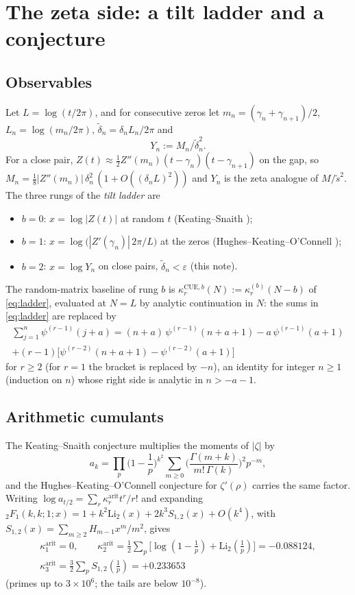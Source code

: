 \documentclass[12pt]{amsart}
\theoremstyle{remark}
\newcommand{\eps}{\varepsilon}
\newcommand{\1}{\mathbf{1}}
\begin{document}
\section{The zeta side: a tilt ladder and a conjecture}\label{sec:zeta}

\subsection*{Observables}
Let $L=\log(t/2\pi)$, and for consecutive zeros let
$m_n=(\gamma_n+\gamma_{n+1})/2$, $L_n=\log(m_n/2\pi)$,
$\tilde\delta_n=\delta_nL_n/2\pi$ and
\[
Y_n:=M_n/\tilde\delta_n^2 .
\]
For a close pair, $Z(t)\approx\frac12Z''(m_n)(t-\gamma_n)(t-\gamma_{n+1})$
on the gap, so $M_n=\frac18|Z''(m_n)|\,\delta_n^2\,(1+O((\delta_nL)^2))$ and
$Y_n$ is the zeta analogue of $M/\tilde s^2$. The three rungs of the
\emph{tilt ladder} are
\begin{itemize}
\item $b=0$: $x=\log|Z(t)|$ at random $t$ (Keating--Snaith \cite{KS00});
\item $b=1$: $x=\log\big(|Z'(\gamma_n)|\,2\pi/L\big)$ at the zeros
(Hughes--Keating--O'Connell \cite{HKO00});
\item $b=2$: $x=\log Y_n$ on close pairs, $\tilde\delta_n<\eps$ (this note).
\end{itemize}
The random-matrix baseline of rung $b$ is $\kappa_r^{\mathrm{CUE},b}(N):=
\kappa_r^{(b)}(N-b)$ of \eqref{eq:ladder}, evaluated at $N=L$ by analytic
continuation in $N$: the sums in \eqref{eq:ladder} are replaced by
\begin{multline*}
\sum_{j=1}^n\psi^{(r-1)}(j+a)=(n+a)\,\psi^{(r-1)}(n+a+1)-a\,\psi^{(r-1)}(a+1)\\
+(r-1)\big[\psi^{(r-2)}(n+a+1)-\psi^{(r-2)}(a+1)\big]
\end{multline*}
for $r\ge2$ (for $r=1$ the bracket is replaced by $-n$), an identity for
integer $n\ge1$ (induction on $n$) whose right side is analytic in
$n>-a-1$.

\subsection*{Arithmetic cumulants}
The Keating--Snaith conjecture \cite{KS00} multiplies the moments of
$|\zeta|$ by
\[
a_k=\prod_p\Big(1-\frac1p\Big)^{k^2}\sum_{m\ge0}
\Big(\frac{\Gamma(m+k)}{m!\,\Gamma(k)}\Big)^2p^{-m},
\]
and the Hughes--Keating--O'Connell conjecture for $\zeta'(\rho)$
\cite{HKO00} carries the same factor. Writing
$\log a_{t/2}=\sum_r\kappa_r^{\mathrm{arit}}t^r/r!$ and expanding
${}_2F_1(k,k;1;x)=1+k^2\mathrm{Li}_2(x)+2k^3S_{1,2}(x)+O(k^4)$, with
$S_{1,2}(x)=\sum_{m\ge2}H_{m-1}x^m/m^2$, gives
\begin{gather*}
\kappa_1^{\mathrm{arit}}=0,\qquad
\kappa_2^{\mathrm{arit}}=\tfrac12\sum_p\big[\log(1-\tfrac1p)+\mathrm{Li}_2(\tfrac1p)\big]
=-0.088124,\\
\kappa_3^{\mathrm{arit}}=\tfrac32\sum_pS_{1,2}(\tfrac1p)=+0.233653
\end{gather*}
(primes up to $3\times10^6$; the tails are below $10^{-8}$).
\end{document}
